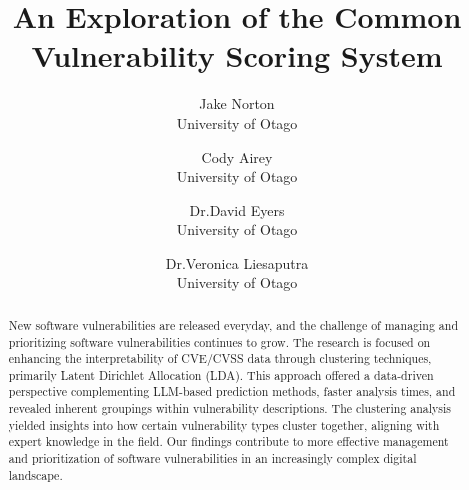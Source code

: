 \newcommand{\note}[2][red]{\textcolor{#1}{#2}}
\newcommand{\notedme}[1]{\note[blue]{[<Dave> #1]}}
\newenvironment{scaffold}{\color{red}}{}
\newcommand{\change}[2][]{\textcolor{orange}{#2}}



\date{}

\title{\Large \bf An Exploration of the Common Vulnerability Scoring System}

\author{
	{\rm Jake Norton}\\
	University of Otago
	\and
	{\rm Cody Airey}\\
	University of Otago
	\and
	{\rm Dr.\@ David Eyers} \\
	University of Otago
	\and
	{\rm Dr.\@ Veronica Liesaputra} \\
	University of Otago
} %

\maketitle

\begin{abstract}
	New software vulnerabilities are released everyday, and the challenge of managing and prioritizing software vulnerabilities continues to grow.  The research is focused on enhancing the interpretability of CVE/CVSS data through clustering techniques, primarily Latent Dirichlet Allocation (LDA). This approach offered a data-driven perspective complementing LLM-based prediction methods, faster analysis times, and revealed inherent groupings within vulnerability descriptions. The clustering analysis yielded insights into how certain vulnerability types cluster together, aligning with expert knowledge in the field. Our findings contribute to more effective management and prioritization of software vulnerabilities in an increasingly complex digital landscape.





\end{abstract}


